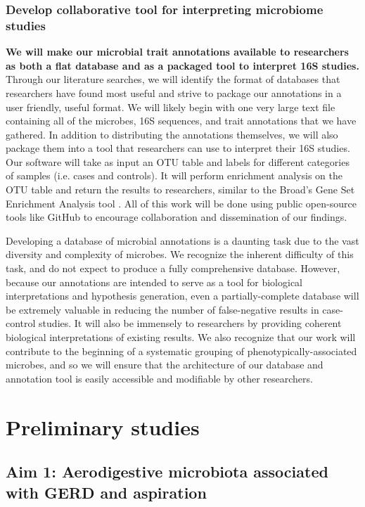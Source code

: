 \documentclass[12pt]{article}
\begin{document}
\subsubsection{Develop collaborative tool for interpreting microbiome studies}
\textbf{We will make our microbial trait annotations available to researchers as both
a flat database and as a packaged tool to interpret
16S studies.} Through our literature searches, 
we will identify the format of databases that researchers have found most 
useful and strive to package our annotations in a user friendly, useful format. 
We will likely begin with one very large text file containing all of 
the microbes, 16S sequences, and trait annotations that we have gathered. In addition to distributing the annotations themselves, we will also package them into a tool 
that researchers can use to interpret their 16S 
studies. Our software will take as input an OTU table and labels for different categories
of samples (i.e. cases and controls). 
It will perform enrichment analysis on the OTU table and return the 
results to researchers, similar to the Broad's Gene Set Enrichment Analysis tool \cite{subramanian-gsea-2005}. All of this work will be done using public open-source tools like 
GitHub to encourage collaboration and dissemination of our findings.

Developing a database of microbial annotations is a daunting task due 
to the vast diversity and complexity of microbes. We recognize the 
inherent difficulty of this task, and do not expect to produce a fully 
comprehensive database. However, because our annotations are intended 
to serve as a tool for biological interpretations and hypothesis 
generation, even a partially-complete database will be extremely 
valuable in reducing the number of false-negative results in case-control 
studies. It will also be immensely
to researchers by providing coherent biological interpretations 
of existing results. We also recognize that our work will contribute to the 
beginning of a systematic grouping of phenotypically-associated 
microbes, and so we will ensure that the architecture of our database and annotation tool 
is easily accessible and modifiable by other researchers.


\section{Preliminary studies}

\subsection{Aim 1: Aerodigestive microbiota associated with GERD and aspiration}
\end{document}
